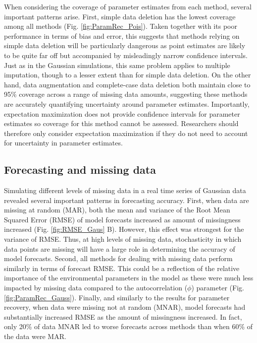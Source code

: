 \documentclass{article}
\begin{document}
\begin{linenumbers}
When considering the coverage of parameter estimates from each method, several important patterns arise. First, simple data deletion has the lowest coverage among all methods (Fig. \ref{fig:ParamRec_Pois}). Taken together with its poor performance in terms of bias and error, this suggests that methods relying on simple data deletion will be particularly dangerous as point estimates are likely to be quite far off but accompanied by misleadingly narrow confidence intervals. Just as in the Gaussian simulations, this same problem applies to multiple imputation, though to a lesser extent than for simple data deletion. On the other hand, data augmentation and complete-case data deletion both maintain close to 95\% coverage across a range of missing data amounts, suggesting these methods are accurately quantifying uncertainty around parameter estimates. Importantly, expectation maximization does not provide confidence intervals for parameter estimates so coverage for this method cannot be assessed. Researchers should therefore only consider expectation maximization if they do not need to account for uncertainty in parameter estimates.


\subsection*{Forecasting and missing data}
Simulating different levels of missing data in a real time series of Gaussian data revealed several important patterns in forecasting accuracy. First, when data are missing at random (MAR), both the mean and variance of the Root Mean Squared Error (RMSE) of model forecasts increased as amount of missingness increased (Fig. \ref{fig:RMSE_Gaus} B). However, this effect was strongest for the variance of RMSE. Thus, at high levels of missing data, stochasticity in which data points are missing will have a large role in determining the accuracy of model forecasts. Second, all methods for dealing with missing data perform similarly in terms of forecast RMSE. This could be a reflection of the relative importance of the environmental parameters in the model as these were much less impacted by missing data compared to the autocorrelation ($\phi$) parameter (Fig. \ref{fig:ParamRec_Gauss}). Finally, and similarly to the results for parameter recovery, when data were missing not at random (MNAR), model forecasts had substantially increased RMSE as the amount of missingness increased. In fact, only 20\% of data MNAR led to worse forecasts across methods than when 60\% of the data were MAR.


\end{linenumbers}
\end{document}
